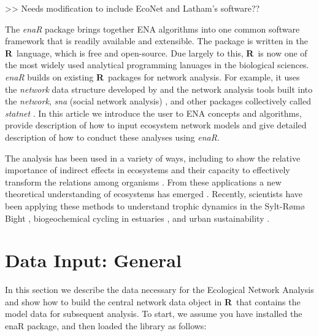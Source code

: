 \documentclass[article]{jss}
\newcommand{\R}{\textbf{R}}
\begin{document}
>> Needs modification to include EcoNet and Latham's software??

The \textit{enaR} package brings together ENA algorithms into one
common software framework that is readily available and extensible.
The package is written in the \R\ language, which is free and
open-source.  Due largely to this, \R\ is now one of the most widely
used analytical programming lanuages in the biological
sciences. \textit{enaR} builds on existing \R\ packages for
network analysis. For example, it uses the \textit{network} data
structure developed by \citet{butts08_network} and the network
analysis tools built into the \textit{network}, \textit{sna} (social
network analysis) \citep{butts08_social}, and other packages
collectively called \textit{statnet} \citep{handcock2008statnet}. In
this article we introduce the user to ENA concepts and algorithms,
provide description of how to input ecosystem network models and give
detailed description of how to conduct these analyses using
\textit{enaR}.







The analysis has been used in a variety of ways, including to show the
relative importance of indirect effects in ecosystems \citep{patten83,
higashi89, salas11_did} and their capacity to effectively transform
the relations among organisms \citep{ulanowicz90, patten91, fath98,
bondavalli99}.  From these applications a new theoretical
understanding of ecosystems has emerged \citep{higashi91, belgrano05,
jorgensen07_newecology}.  Recently, scientists have been applying
these methods to understand trophic dynamics in the Sylt-R{\o}m{\o}
Bight \citep{baird04_sylt,baird08_sylt}, biogeochemical cycling in
estuaries \cite{christian03, hines12}, and urban sustainability
\citep{zhang10, chen12}.


\section{Data Input: General}

In this section we describe the data necessary for the Ecological
Network Analysis and show how to build the central network data object
in \R\ that contains the model data for subsequent analysis.  To
start, we assume you have installed the enaR package, and then loaded
the library as follows:

\end{document}
